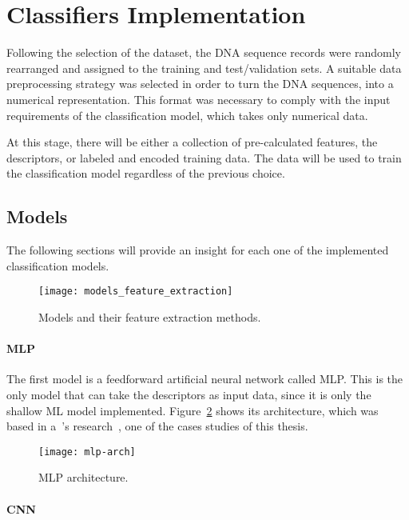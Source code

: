 \section{Classifiers Implementation}

Following the selection of the dataset, the \gls{DNA} sequence records were randomly rearranged and assigned to the training and test/validation sets. A suitable data preprocessing strategy was selected in order to turn the \gls{DNA} sequences, into a numerical representation. This format was necessary to comply with the input requirements of the classification model, which takes only numerical data.

At this stage, there will be either a collection of pre-calculated features, the descriptors, or labeled and encoded training data. The data will be used to train the classification model regardless of the previous choice.

\subsection{Models}

The following sections will provide an insight for each one of the implemented classification models.

\begin{figure}[htbp]
    \centering
    \texttt{[image: models\_feature\_extraction]}
    \caption{Models and their feature extraction methods.}
    \label{fig:models_feature_extraction}
\end{figure}

\paragraph{MLP}

The first model is a feedforward artificial neural network called \gls{MLP}. This is the only model that can take the descriptors as input data, since it is only the shallow \gls{ML} model implemented. Figure~\ref{fig:mlp-arch} shows its architecture, which was based in a~\citeauthor{Zhang2020DeepHE:Learning}'s research~\cite{Zhang2020DeepHE:Learning}, one of the cases studies of this thesis.

\begin{figure}[htbp]
    \centering
    \texttt{[image: mlp-arch]}
    \caption{MLP architecture.}
    \label{fig:mlp-arch}
\end{figure}

\paragraph{CNN}

